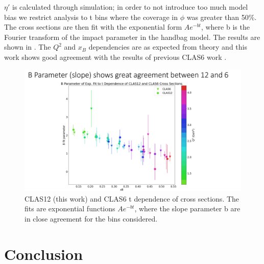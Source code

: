     $\eta'$ is calculated through simulation; in order to not introduce too much model bias we restrict analysis to t bins where the coverage in $\phi$ was greater than 50\%. The cross sections are then fit with the exponential form $Ae^{-bt}$, where b is the Fourier transform of the impact parameter in the handbag model. The results are shown in . The $Q^2$ and $x_B$ dependencies are as expected from theory and this work shows good agreement with the results of previous CLAS6 work \parencite{Bedlinskiy2014ExclusiveCLAS}. %

    \begin{figure}[hbt]
    	\centering
    	\includegraphics[trim={0 0 0 2.1cm},clip,width=0.8\linewidth]{Chapters/Ch5-Further/t_dependence/pics/bslopes.png}
    
    	\caption[Bslopes]{CLAS12 (this work) and CLAS6 \parencite{Bedlinskiy2014ExclusiveCLAS} t dependence of cross sections. The fits are exponential functions $Ae^{-bt}$, where the slope parameter b are in close agreement for the bins considered.}
    	\label{fig:bslopes}
    \end{figure}
    

    


%    

\clearpage
\section{Conclusion}


